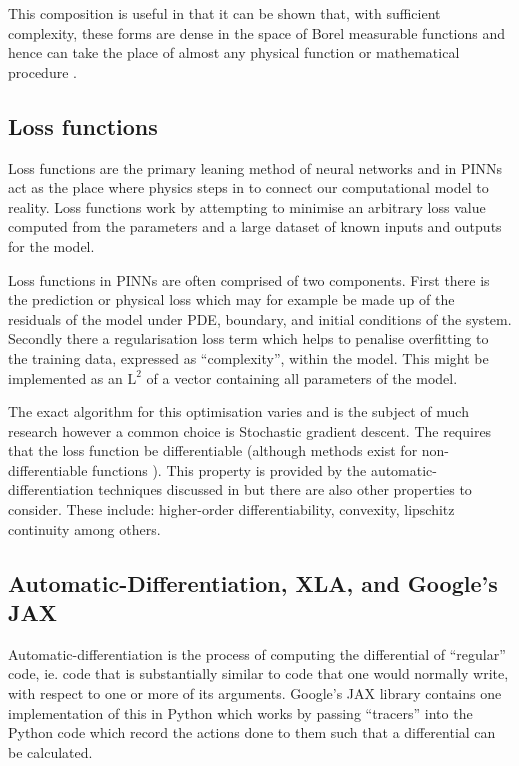 This composition is useful in that it can be shown that, with sufficient complexity, these forms are dense in the space of Borel measurable functions and hence can take the place of almost any physical function or mathematical procedure \cite{hornikMultilayerFeedforwardNetworks1989}.

\subsection{Loss functions}
\label{sec:intro-lf}

Loss functions are the primary leaning method of neural networks and in PINNs act as the place where physics steps in to connect our computational model to reality. Loss functions work by attempting to minimise an arbitrary loss value computed from the parameters and a large dataset of known inputs and outputs for the model.

Loss functions in PINNs are often comprised of two components. First there is the prediction or physical loss which may for example be made up of the residuals of the model under PDE, boundary, and initial conditions of the system. Secondly there a regularisation loss term which helps to penalise overfitting to the training data, expressed as \enquote{complexity}, within the model. This might be implemented as an $\mathrm{L}^2$  of a vector containing all parameters of the model.

The exact algorithm for this optimisation varies and is the subject of much research  however a common choice is Stochastic gradient descent. The requires that the loss function be differentiable (although methods exist for non-differentiable functions \cite{daubechiesIterativeThresholdingAlgorithm2003}). This property is provided by the automatic-differentiation techniques discussed in  but there are also other properties to consider\cite{sraOptimizationMachineLearning2012}. These include: higher-order differentiability, convexity, lipschitz continuity \cite{mohammadiPerformanceNoisyNesterov2019} among others. 

\subsection{Automatic-Differentiation, XLA, and Google's JAX}
\label{sec:intro-autodiff}

Automatic-differentiation is the process of computing the differential of \enquote{regular} code, ie. code that is substantially similar to code that one would normally write, with respect to one or more of its arguments. Google's JAX library \cite{jax2018github} contains one implementation of this in Python which works by passing \enquote{tracers} into the Python code which record the actions done to them such that a differential can be calculated.


